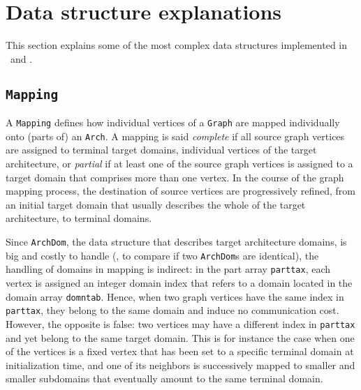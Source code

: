 
\section{Data structure explanations}
\label{sec-data}

This section explains some of the most complex data structures
implemented in \scotch\ and \ptscotch.

\subsection{\texttt{Mapping}}
\label{sec-data-mapping}

A \texttt{Mapping} defines how individual vertices of a \texttt{Graph}
are mapped individually onto (parts of) an \texttt{Arch}. A mapping is
said \textit{complete} if all source graph vertices are assigned to
terminal target domains, \ie individual vertices of the target
architecture, or \textit{partial} if at least one of the source graph
vertices is assigned to a target domain that comprises more than one
vertex. In the course of the graph mapping process, the destination of
source vertices are progressively refined, from an initial target
domain that usually describes the whole of the target architecture, to
terminal domains.

Since \texttt{ArchDom}, the data structure that describes target
architecture domains, is big and costly to handle (\eg, to compare if
two \texttt{ArchDom}s are identical), the handling of domains in
mapping is indirect: in the part array \texttt{parttax}, each vertex
is assigned an integer domain index that refers to a domain located in
the domain array \texttt{domntab}. Hence, when two graph vertices have
the same index in \texttt{parttax}, they belong to the same domain and
induce no communication cost. However, the opposite is false: two
vertices may have a different index in \texttt{parttax} and yet belong
to the same target domain. This is for instance the case when one of
the vertices is a fixed vertex that has been set to a specific
terminal domain at initialization time, and one of its neighbors is
successively mapped to smaller and smaller subdomains that eventually
amount to the same terminal domain.

